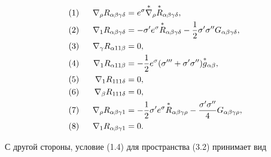 \begin{alignat}{2}


(1&) &\ \; \nabla_\rho R_{\alpha\beta\gamma\delta}&= 


e^\sigma\up{\nabla}_\rho\up{R}_{\alpha\beta\gamma\delta},\notag \\ 


(2&) &\ \; \nabla_1 R_{\alpha\beta\gamma\delta}&= 


-\sigma'e^\sigma\up{R}_{\alpha\beta\gamma\delta}- 


\frac{1}{2}\sigma'\sigma'' G_{\alpha\beta\gamma\delta},\notag \\ 


(3&) &\ \; \nabla_\gamma R_{\alpha 11\beta}&=0,\notag \\ 


(4&) &\ \; \nabla_1 R_{\alpha 11 \beta}&=-\frac{1}{2}e^\sigma 


(\sigma'''+\sigma'\sigma'')\up{g}_{\alpha\beta},\\ 


(5&) &\ \; \nabla_1 R_{111\delta}&=0,\notag\\ 


(6&) &\ \; \nabla_\beta R_{111\delta}&=0,\notag\\ 


(7&) &\ \; \nabla_\rho R_{\alpha\beta\gamma 1}&=-\frac{1}{2} 


\sigma'e^\sigma\up{R}_{\alpha\beta\gamma\rho}- 


\frac{\sigma'\sigma''}{4}G_{\alpha\beta\gamma\rho},\notag\\ 


(8&) &\ \; \nabla_1 R_{\alpha\beta\gamma 1}&=0.\notag 


\end{alignat} 


С другой стороны, условие (1.4) для пространства (3.2) принимает вид 


